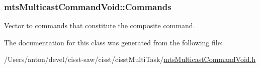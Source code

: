 \subsubsection[{Commands}]{ mts\+Multicast\+Command\+Void\+::\+Commands\hspace{0.3cm}{\ttfamily [protected]}}\label{classmts_multicast_command_void_a71303972432c845838760333033f6226}
Vector to commands that constitute the composite command. 

The documentation for this class was generated from the following file\+:\begin{DoxyCompactItemize}
\item 
/\+Users/anton/devel/cisst-\/saw/cisst/cisst\+Multi\+Task/\hyperlink{mts_multicast_command_void_8h}{mts\+Multicast\+Command\+Void.\+h}\end{DoxyCompactItemize}
